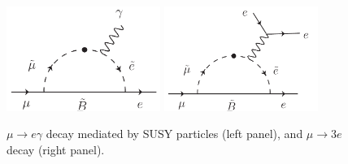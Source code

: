 
\begin{figure}[t]
\begin{center}
\includegraphics[width=5cm]{ChargedLeptons/Figures/mu_e_gamma.pdf} \hspace*{2cm}
\includegraphics[width=5cm]{ChargedLeptons/Figures/mu_3e.pdf}
\caption{\label{CL:mutoegamma}$\mu \rightarrow e\gamma$ decay mediated by SUSY particles (left panel), and $\mu \rightarrow 3e$ decay (right panel).}
\end{center}
\end{figure}

